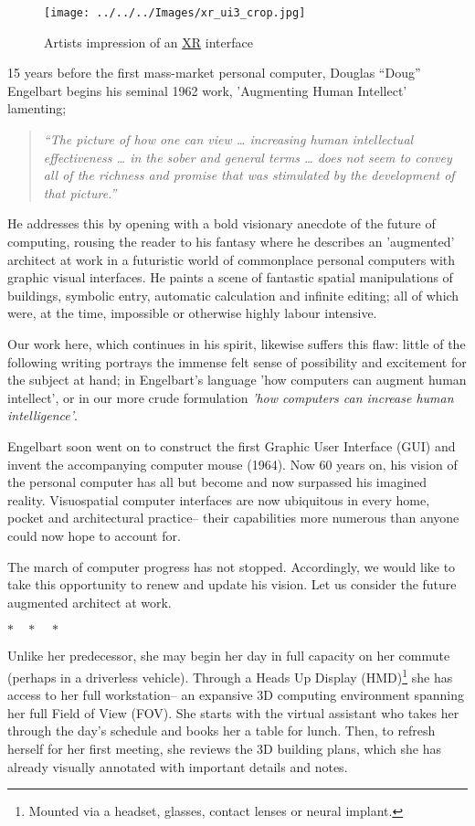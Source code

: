 \documentclass[logo,bsc,singlespacing,parskip]{infthesis}
\newcommand{\threestars}{\begin{center}$ {\ast}\quad{\ast}\quad{\ast} $\end{center}}
\begin{document}
\begin{figure}[h]
\centering
\texttt{[image: ../../../Images/xr\_ui3\_crop.jpg]}
\caption{Artists impression of an \hyperref[orgf7f8e78]{XR} interface}
\end{figure}

15 years before the first mass-market personal computer, Douglas ``Doug'' Engelbart begins his seminal 1962 work, 'Augmenting Human Intellect' \autocite{engelbartAugmentingHumanIntellect1962} lamenting;

\begin{quote}
\emph{``The picture of how one can view \ldots{} increasing human intellectual effectiveness \ldots{} in the sober and general terms \ldots{} does not seem to convey all of the richness and promise that was stimulated by the development of that picture.''}
\end{quote}

He addresses this by opening with a bold visionary anecdote of the future of computing, rousing the reader to his fantasy where he describes an 'augmented' architect at work in a futuristic world of commonplace personal computers with graphic visual interfaces.
He paints a scene of fantastic spatial manipulations of buildings, symbolic entry, automatic calculation and infinite editing; all of which were, at the time, impossible or otherwise highly labour intensive.

Our work here, which continues in his spirit, likewise suffers this flaw: little of the following writing portrays the immense felt sense of possibility and excitement for the subject at hand; in Engelbart's language 'how computers can augment human intellect', or in our more crude formulation \emph{'how computers can increase human intelligence'}.

Engelbart soon went on to construct the first Graphic User Interface (GUI) and invent the accompanying computer mouse (1964).
Now 60 years on, his vision of the personal computer has all but become and now surpassed his imagined reality.
Visuospatial computer interfaces are now ubiquitous in every home, pocket and architectural practice-- their capabilities more numerous than anyone could now hope to account for.

The march of computer progress has not stopped.
Accordingly, we would like to take this opportunity to renew and update his vision.
Let us consider the future augmented architect at work.
\threestars

Unlike her predecessor, she may begin her day in full capacity on her commute (perhaps in a driverless vehicle).
Through a Heads Up Display (HMD)\footnote{Mounted via a headset, glasses, contact lenses or neural implant.} she has access to her full workstation-- an expansive 3D computing environment spanning her full Field of View (FOV).
She starts with the virtual assistant who takes her through the day's schedule and books her a table for lunch.
Then, to refresh herself for her first meeting, she reviews the 3D building plans, which she has already visually annotated with important details and notes.
\end{document}
